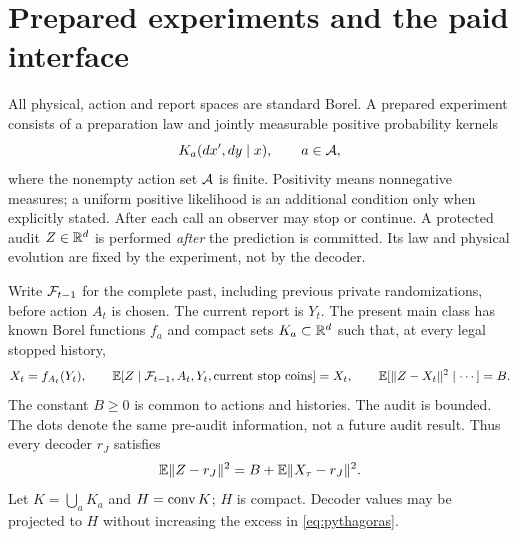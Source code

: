 \section{Prepared experiments and the paid interface}\label{sec:experiment}
All physical, action and report spaces are standard Borel. A prepared experiment consists of a preparation law and jointly measurable positive probability kernels
\[
 K_a(dx',dy\mid x),\qquad a\in\mathcal A,
\]
where the nonempty action set $\mathcal A$ is finite. Positivity means nonnegative measures; a uniform positive likelihood is an additional condition only when explicitly stated. After each call an observer may stop or continue. A protected audit $Z\in\mathbb R^d$ is performed \emph{after} the prediction is committed. Its law and physical evolution are fixed by the experiment, not by the decoder.

Write $\mathcal F_{t-1}$ for the complete past, including previous private randomizations, before action $A_t$ is chosen. The current report is $Y_t$. The present main class has known Borel functions $f_a$ and compact sets $K_a\subset\mathbb R^d$ such that, at every legal stopped history,
\begin{equation}\label{eq:audit}
 X_t=f_{A_t}(Y_t),\qquad
 \mathbb E[Z\mid\mathcal F_{t-1},A_t,Y_t,\text{current stop coins}]=X_t,
 \qquad \mathbb E[\lVert Z-X_t\rVert^2\mid\cdots]=B.
\end{equation}
The constant $B\ge0$ is common to actions and histories. The audit is bounded. The dots denote the same pre-audit information, not a future audit result. Thus every decoder $r_J$ satisfies
\begin{equation}\label{eq:pythagoras}
 \mathbb E\lVert Z-r_J\rVert^2=B+\mathbb E\lVert X_\tau-r_J\rVert^2.
\end{equation}
Let $K=\bigcup_a K_a$ and $H=\operatorname{conv} K$; $H$ is compact. Decoder values may be projected to $H$ without increasing the excess in \eqref{eq:pythagoras}.

